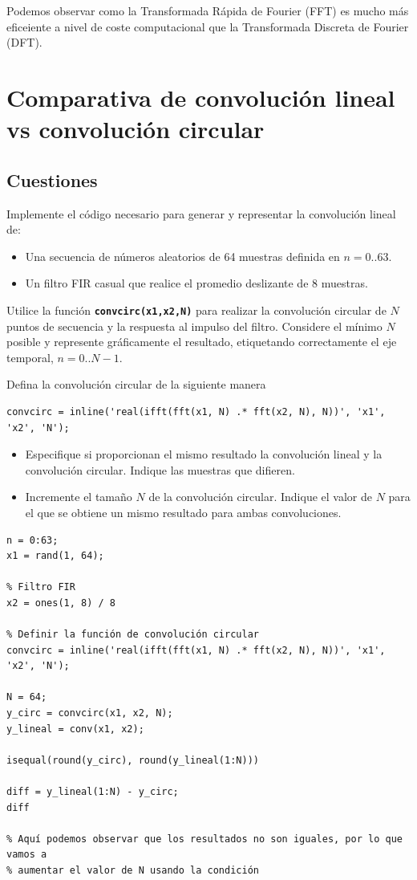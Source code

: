 \documentclass{article}
\newcommand{\code}[1]{\texttt{\textbf{#1}}}
\begin{document}
Podemos observar como la Transformada Rápida de Fourier (FFT) es mucho más eficeiente a nivel de coste computacional que la Transformada Discreta de Fourier (DFT).

\section{Comparativa de convolución lineal vs convolución circular}
\subsection*{Cuestiones}
Implemente el código necesario para generar y representar la convolución lineal de:
\begin{itemize}
\item Una secuencia de números aleatorios de 64 muestras definida en $n=0..63$.
\item Un filtro FIR casual que realice el promedio deslizante de 8 muestras.
\end{itemize}
Utilice la función \code{convcirc(x1,x2,N)} para realizar la convolución circular de $N$ puntos de secuencia y la respuesta al impulso del filtro. Considere el mínimo $N$ posible y represente gráficamente el resultado, etiquetando correctamente el eje temporal, $n=0..N-1$.

Defina la convolución circular de la siguiente manera
\begin{lstlisting}
convcirc = inline('real(ifft(fft(x1, N) .* fft(x2, N), N))', 'x1', 'x2', 'N');
\end{lstlisting}
\begin{itemize}
\item Especifique si proporcionan el mismo resultado la convolución lineal y la convolución circular. Indique las muestras que difieren.
\item Incremente el tamaño $N$ de la convolución circular. Indique el valor de $N$ para el que se obtiene un mismo resultado para ambas convoluciones.
\end{itemize}

\newpage

\begin{lstlisting}
n = 0:63;
x1 = rand(1, 64);

% Filtro FIR
x2 = ones(1, 8) / 8

% Definir la función de convolución circular
convcirc = inline('real(ifft(fft(x1, N) .* fft(x2, N), N))', 'x1', 'x2', 'N');

N = 64;
y_circ = convcirc(x1, x2, N);
y_lineal = conv(x1, x2);

isequal(round(y_circ), round(y_lineal(1:N)))

diff = y_lineal(1:N) - y_circ;
diff

% Aquí podemos observar que los resultados no son iguales, por lo que vamos a
% aumentar el valor de N usando la condición
\end{lstlisting}
\end{document}
